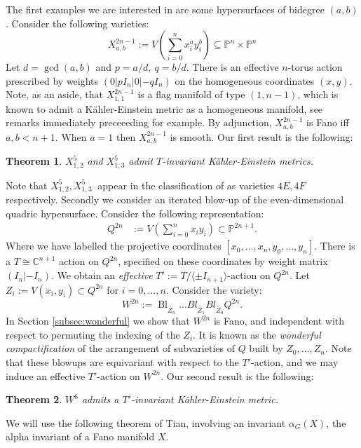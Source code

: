 \documentclass{amsart}
\newtheorem{theorem}{Theorem}[section]
\theoremstyle{definition}
\newcommand{\CC}{\mathbb{C}}
\newcommand{\PP}{\mathbb{P}}
\DeclareMathOperator{\Bl}{Bl}
\begin{document}
The first examples we are interested in are some hypersurfaces of  bidegree \((a,b)\). Consider the following varieties:
\[
X_{a,b}^{2n-1} := V \left( \sum_{i=0}^n x_i^a y_i^b \right) \subseteq \PP^n \times \PP^n
\]
%
%
%
%
%
%
Let \(d = \gcd(a,b)\) and \(p= a/d, \ q = b/d\). There is an effective \(n\)-torus action prescribed by weights  \((0|pI_n|0|-qI_n)\) on the homogeneous coordinates \((x,y)\). Note, as an aside, that \(X^{2n-1}_{1,1}\) is a flag manifold of type \((1,n-1)\), which is known to admit a K\"ahler-Einstein metric as a homogeneous manifold, see remarks immediately preceeeding \cite[Theorem 3]{Matsushima} for example. By adjunction, \(X^{2n-1}_{a,b}\) is Fano iff \(a,b < n+1\). When \(a = 1\) then \(X^{2n-1}_{a,b}\) is smooth. Our first result is the following:
\begin{theorem}\label{thm:KE1}
\(X_{1,2}^5\) and \( X_{1,3}^5\) admit \(T\)-invariant K\"ahler-Einstein metrics.
\end{theorem}
Note that \(X_{1,2}^5, X_{1,3}^5\ \) appear in the classification of \cite{hausen2018torus} as varieties \(4E, 4F\) respectively. Secondly we consider an iterated blow-up of the even-dimensional quadric hypersurface. Consider the following representation:
\begin{align*}
Q^{2n} &:= V \left( \sum_{i=0}^{n} x_{i}y_{i} \right) \subset \PP^{2n+1}.
\end{align*}
Where we have labelled the projective coordinates \([x_0,\dots,x_n,y_0,\dots,y_n]\). There is a \(T \cong \CC^{n+1}\) action on \(Q^{2n}\), specified on these coordinates by weight matrix \((I_n| - I_n)\). We obtain an \textit{effective} \(T' := T / \langle \pm I_{n+1} \rangle \)-action on \(Q^{2n}\). Let \(Z_i := V(x_{i},y_i) \subset Q^{2n}\) for \(i=0,\dots,n\). Consider the variety:
\[
W^{2n} := \Bl_{\tilde{Z_n}}  \dots Bl_{\tilde{Z_1}}  Bl_{\tilde{Z_0}} Q^{2n}.
\]
In Section \ref{subsec:wonderful} we show that \(W^{2n}\) is Fano, and independent with respect to permuting the indexing of the \(Z_i\). It is known as the \textit{wonderful compactification} of the arrangement of subvarieties of \(Q\) built by \(Z_0,\dots,Z_n\). Note that these blowups are equivariant with respect to the \(T'\)-action, and we may induce an effective \(T'\)-action on \(W^{2n}\). Our second result is the following:
\begin{theorem}\label{thm:KE2}
\(W^6\) admits a \(T'\)-invariant K\"ahler-Einstein metric.
\end{theorem}
We will use the following theorem of Tian, involving an invariant \(\alpha_{G}(X)\), the alpha invariant of a Fano manifold \(X\).
\end{document}
